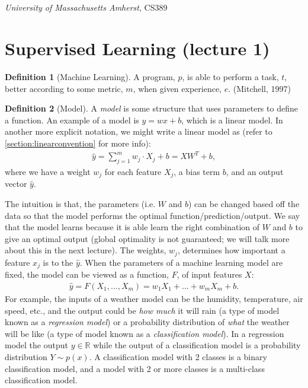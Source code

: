\documentclass[11pt]{article}
\numberwithin{equation}{section}
\theoremstyle{definition}%
\newtheorem{definition}{Definition}[section]%
\begin{document}
\noindent
\begin{center}
    \section*{}
    \subsection*{}
    \emph{University of Massachusetts Amherst}, CS389
\end{center}

\section{Supervised Learning (lecture 1)}
\begin{definition}[Machine Learning]
    A program, $p$, is able to perform a task, $t$, better according to some metric, $m$, when given experience, $e$. (Mitchell, 1997)
\end{definition}
\begin{definition}[Model]
A \emph{model} is some structure that uses parameters to define a function. An example of a model is $y= wx + b$, which is a linear model. In another more explicit notation, we might write a linear model as (refer to \autoref{section:linearconvention} for more info):
\begin{align}
    \hat{y} = \sum_{j=1}^{m}{w_j \cdot X_j + b} = XW^{T} + b,
\end{align}
where we have a weight $w_j$ for each feature $X_j$, a bias term $b$, and an output vector $\hat{y}$. 
\end{definition}

The intuition is that, the parameters (i.e. $W$ and $b$) can be changed based off the data so that the model performs the optimal function/prediction/output. We say that the model learns because it is able learn the right combination of $W$ and $b$ to give an optimal output (global optimality is not guaranteed; we will talk more about this in the next lecture). The weights, $w_j$, determines how important a feature $x_j$ is to the $\hat{y}$. When the parameters of a machine learning model are fixed, the model can be viewed as a function, $F$, of input features $X$:
\begin{align}
    \hat{y} = F(X_1, ..., X_m) = w_1 X_1 + ... + w_m X_m + b.
\end{align}
For example, the inputs of a weather model can be the humidity, temperature, air speed, etc., and the output could be \emph{how much} it will rain (a type of model known as a \emph{regression model}) or a probability distribution of \emph{what} the weather will be like (a type of model known as a \emph{classification model}). In a regression model the output $y \in \mathbb{R}$ while the output of a classification model is a probability distribution $Y \sim p(x)$. A classification model with 2 classes is a binary classification model, and a model with 2 or more classes is a multi-class classification model.
\end{document}
